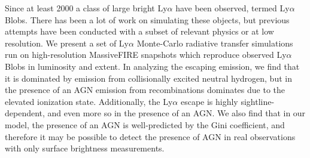 Since at least 2000 a class of large bright Ly$\alpha$ have been observed, termed Ly$\alpha$ Blobs.
There has been a lot of work on simulating these objects, but previous attempts have been conducted with a subset of relevant physics or at low resolution.
We present a set of Ly$\alpha$ Monte-Carlo radiative transfer simulations run on high-resolution MassiveFIRE snapshots which reproduce observed Ly$\alpha$ Blobs in luminosity and extent.
In analyzing the escaping emission, we find that it is dominated by emission from collisionally excited neutral hydrogen, but in the presence of an AGN emission from recombinations dominates due to the elevated ionization state.
Additionally, the Ly$\alpha$ escape is highly sightline-dependent, and even more so in the presence of an AGN.
We also find that in our model, the presence of an AGN is well-predicted by the Gini coefficient, and therefore it may be possible to detect the presence of AGN in real observations with only surface brightness measurements.
